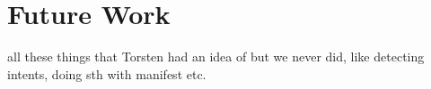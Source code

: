 \section{Future Work}
all these things that Torsten had an idea of but we never did, like detecting intents, doing sth with manifest etc.